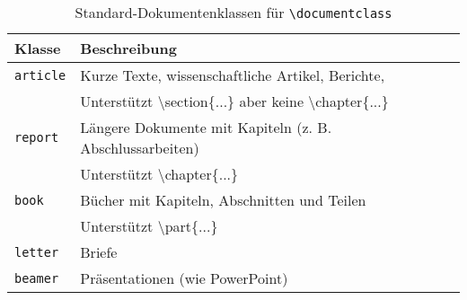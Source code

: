 \begin{table}[h]
    \centering
    \begin{tabular}{ll}
        \toprule
        \textbf{Klasse}  & \textbf{Beschreibung}                                                               \\
        \midrule
        \texttt{article} & Kurze Texte, wissenschaftliche Artikel, Berichte,                                   \\
                         & Unterstützt \textbackslash section\{...\}  aber keine \textbackslash chapter\{...\} \\
        \texttt{report}  & Längere Dokumente mit Kapiteln (z. B. Abschlussarbeiten)                            \\
                         & Unterstützt \textbackslash chapter\{...\}                                           \\
        \texttt{book}    & Bücher mit Kapiteln, Abschnitten und Teilen                                         \\
                         & Unterstützt \textbackslash part\{...\}                                              \\
        \texttt{letter}  & Briefe                                                                              \\

        \texttt{beamer}  & Präsentationen (wie PowerPoint)                                                     \\
        \bottomrule
    \end{tabular}
    \caption{Standard-Dokumentenklassen für \texttt{\textbackslash documentclass}}
    \label{tab:dokumentklassen}
\end{table}